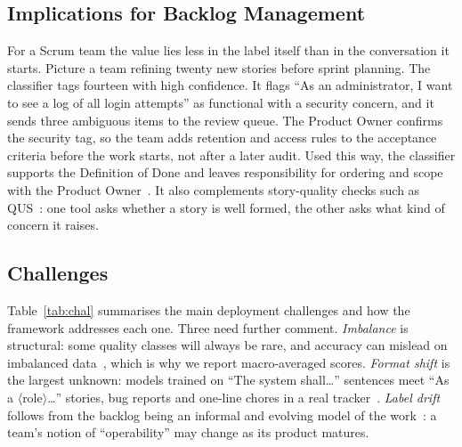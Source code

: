 \documentclass[conference,10pt,letterpaper]{IEEEtran}
\begin{document}
\subsection{Implications for Backlog Management}
For a Scrum team the value lies less in the label itself than in the conversation it starts. Picture a team refining twenty new stories before sprint planning. The classifier tags fourteen with high confidence. It flags “As an administrator, I want to see a log of all login attempts” as functional with a security concern, and it sends three ambiguous items to the review queue. The Product Owner confirms the security tag, so the team adds retention and access rules to the acceptance criteria before the work starts, not after a later audit. Used this way, the classifier supports the Definition of Done and leaves responsibility for ordering and scope with the Product Owner~\cite{scrumguide2020}. It also complements story-quality checks such as QUS~\cite{lucassen2016qus}: one tool asks whether a story is well formed, the other asks what kind of concern it raises.

\subsection{Challenges}
Table~\ref{tab:chal} summarises the main deployment challenges and how the framework addresses each one. Three need further comment. \emph{Imbalance} is structural: some quality classes will always be rare, and accuracy can mislead on imbalanced data~\cite{johnson2019}, which is why we report macro-averaged scores. \emph{Format shift} is the largest unknown: models trained on “The system shall…” sentences meet “As a $\langle$role$\rangle$…” stories, bug reports and one-line chores in a real tracker~\cite{vancan2025}. \emph{Label drift} follows from the backlog being an informal and evolving model of the work~\cite{sedano2019}: a team's notion of “operability” may change as its product matures.
\end{document}
